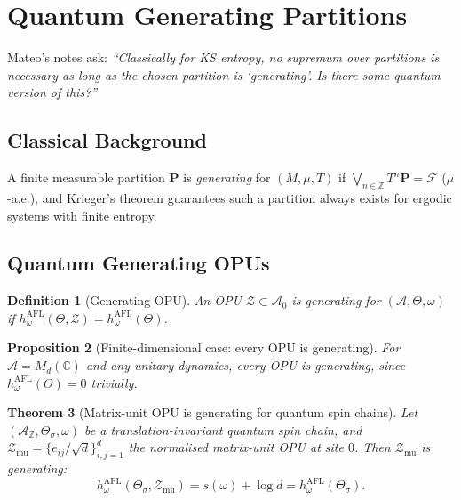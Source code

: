 \documentclass[12pt,a4paper]{article}
\newtheorem{theorem}{Theorem}[section]
\newtheorem{proposition}[theorem]{Proposition}
\newtheorem{definition}[theorem]{Definition}
\newcommand{\A}{\mathcal{A}}
\begin{document}
\section{Quantum Generating Partitions}
\label{sec:gen}

Mateo's notes ask: \emph{``Classically for KS entropy, no supremum over
partitions is necessary as long as the chosen partition is `generating'.
Is there some quantum version of this?''}

\subsection{Classical Background}

A finite measurable partition $\mathbf{P}$ is \emph{generating} for $(M,\mu,T)$ if
$\bigvee_{n\in\mathbb{Z}}T^n\mathbf{P}=\mathscr{F}$ ($\mu$-a.e.), and Krieger's theorem
guarantees such a partition always exists for ergodic systems with finite entropy.

\subsection{Quantum Generating OPUs}

\begin{definition}[Generating OPU]
\label{def:gen_opu}
An OPU $\mathcal{Z}\subset\A_0$ is \emph{generating} for $(\A,\Theta,\omega)$ if
$h_\omega^{\mathrm{AFL}}(\Theta,\mathcal{Z})=h_\omega^{\mathrm{AFL}}(\Theta)$.
\end{definition}

\begin{proposition}[Finite-dimensional case: every OPU is generating]
\label{prop:gen_finite}
For $\A=M_d(\mathbb{C})$ and any unitary dynamics, every OPU is generating, since
$h_\omega^{\mathrm{AFL}}(\Theta)=0$ trivially.
\end{proposition}

\begin{theorem}[Matrix-unit OPU is generating for quantum spin chains]
\label{thm:gen_spinchain}
Let $(\A_\mathbb{Z},\Theta_\sigma,\omega)$ be a translation-invariant quantum spin chain,
and $\mathcal{Z}_{\mathrm{mu}}=\{e_{ij}/\sqrt{d}\}_{i,j=1}^d$ the normalised matrix-unit
OPU at site $0$.  Then $\mathcal{Z}_{\mathrm{mu}}$ is generating:
\[
  h_\omega^{\mathrm{AFL}}(\Theta_\sigma,\mathcal{Z}_{\mathrm{mu}})
  = s(\omega)+\log d
  = h_\omega^{\mathrm{AFL}}(\Theta_\sigma).
\]
\end{theorem}
\end{document}
